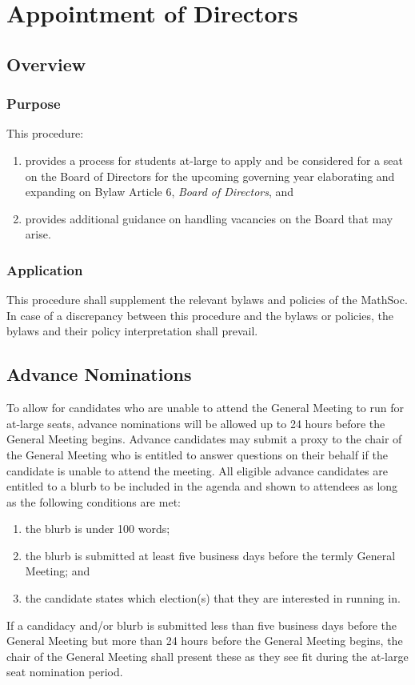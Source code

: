 \section{Appointment of Directors}
\subsection{Overview}
\subsubsection{Purpose}
This procedure:
\begin{enumerate}
	\item provides a process for students at-large to apply and be considered for a seat on the
	      Board of Directors for the upcoming governing year elaborating and expanding on Bylaw Article 6,
	      \textit{Board of Directors}, and
	\item provides additional guidance on handling vacancies on the Board that may arise.
\end{enumerate}

\subsubsection{Application}
This procedure shall supplement the relevant bylaws and policies of the MathSoc.
In case of a discrepancy between this procedure and the bylaws or policies, the bylaws and their policy interpretation shall prevail.

\subsection{Advance Nominations}
To allow for candidates who are unable to attend the General Meeting to run for at-large seats, advance nominations will be allowed up to 24 hours before the General Meeting begins.
Advance candidates may submit a proxy to the chair of the General Meeting who is entitled to answer questions on their behalf if the candidate is unable to attend the meeting.
All eligible advance candidates are entitled to a blurb to be included in the agenda and shown to attendees as long as the following conditions are met:
\begin{enumerate}
	\item the blurb is under 100 words;
	\item the blurb is submitted at least five business days before the termly General Meeting; and
	\item the candidate states which election(s) that they are interested in running in.
\end{enumerate}
If a candidacy and/or blurb is submitted less than five business days before the General Meeting but more than 24 hours before the General Meeting begins, the chair of the General Meeting shall present these as they see fit during the at-large seat nomination period.

